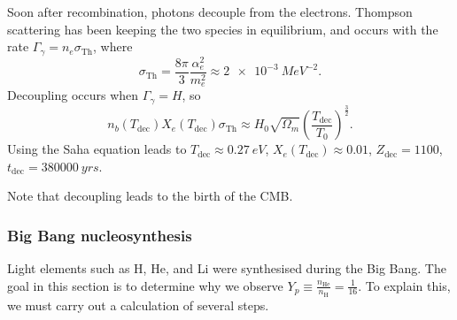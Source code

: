 \documentclass{jknotes}
\begin{document}
Soon after recombination, photons decouple from the electrons. Thompson scattering has been keeping the two species in equilibrium, and occurs with the rate \(\Gamma_\gamma = n_e\sigma_{\text{Th}}\), where
\begin{equation}
    \sigma_{\text{Th}} = \frac{8\pi}{3}\frac{\alpha_e^2}{m_e^2} \approx \SI{2e-3}{MeV^{-2}}.
\end{equation}
Decoupling occurs when \(\Gamma_\gamma = H\), so
\begin{equation}
    n_b(T_{\text{dec}})X_e(T_{\text{dec}})\sigma_{\text{Th}} \approx H_0\sqrt{\Omega_m} \left(\frac{T_{\text{dec}}}{T_0}\right)^{\frac32}.
\end{equation}
Using the Saha equation leads to \(T_{\text{dec}} \approx \SI{0.27}{eV}\), \(X_e(T_{\text{dec}}) \approx 0.01\), \(Z_{\text{dec}} = 1100\), \(t_{\text{dec}} = \SI{380000}{yrs}\).

Note that decoupling leads to the birth of the CMB.

\subsubsection*{Big Bang nucleosynthesis}
Light elements such as H, He, and Li were synthesised during the Big Bang. The goal in this section is to determine why we observe \(Y_p \equiv \frac{n_{\text{He}}}{n_{\text{H}}} = \frac1{16}\). To explain this, we must carry out a calculation of several steps.

\begin{figure}[H]
    \centering
\end{figure}
\end{document}
